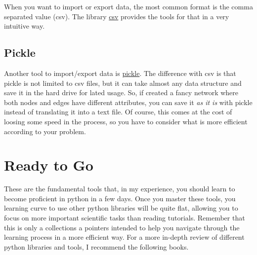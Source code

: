 \documentclass[11pt]{article}
\begin{document}
When you want to import or export data, the most common format is the comma separated value (csv). The library \href{https://docs.python.org/2/library/csv.html}{csv} provides the tools for that in a very intuitive way.


\subsection{Pickle}

Another tool to import/export data is \href{https://docs.python.org/2/library/pickle.html}{pickle}. The difference with csv is that pickle is not limited to csv files, but it can take almost any data structure and save it in the hard drive for lated usage. So, if created a fancy network where both nodes and edges have different attributes, you can save it \emph{as it is} with pickle instead of translating it into a text file. Of course, this comes at the cost of loosing some speed in the process, so you have to consider what is more efficient according to your problem.



\section{Ready to Go}

These are the fundamental tools that, in my experience, you should learn to become proficient in python in a few days. Once you master these tools, you learning curve to use other python libraries will be quite flat, allowing you to focus on more important scientific tasks than reading tutorials. Remember that this is only a collections a pointers intended to help you navigate through the learning process in a more efficient way. For a more in-depth review of different python libraries and tools, I recommend the following books.
\end{document}
